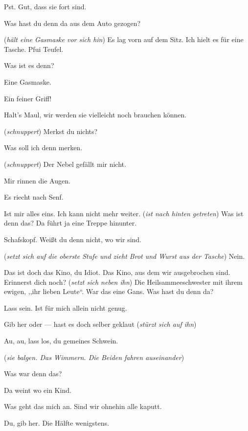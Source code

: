 \documentclass[
	final,
	a4paper,
	ngerman,
	mpinclude = true, %
	twoside = true,
	open = right,
	cleardoublepage = plain,
	DIV = 13,
	BCOR = 1cm,
	titlepage = firstiscover,
	]{scrbook}
\newcommand{\direction}[1]{(\textit{#1})}
\newcommand{\character}[1]{\item[#1]}
\newcommand{\ErsterMann}{\character{1. Mann}}
\newcommand{\ZweiterMann}{\character{2. Mann}}
\begin{document}
\begin{play}

\ErsterMann
Pst. Gut, dass sie fort sind.

\ZweiterMann
Was hast du denn da aus dem Auto gezogen?

\ErsterMann
\direction{hält eine Gasmaske vor sich hin} Es lag vorn auf dem Sitz. Ich hielt es für eine Tasche. Pfui Teufel.

\ZweiterMann
Was ist es denn?

\ErsterMann
Eine Gasmaske.

\ZweiterMann
Ein feiner Griff!

\ErsterMann
Halt's Maul, wir werden sie vielleicht noch brauchen können.

\direction{schnuppert} Merkst du nichts?

\ZweiterMann
Was soll ich denn merken.

\ErsterMann
\direction{schnuppert} Der Nebel gefällt mir nicht.

\ZweiterMann
Mir rinnen die Augen.

\ErsterMann
Es riecht nach Senf.

\ZweiterMann
Ist mir alles eins. Ich kann nicht mehr weiter. \direction{ist nach hinten getreten} Was ist denn das? Da führt ja eine Treppe hinunter.

\ErsterMann
Schafskopf. Weißt du denn nicht, wo wir sind.

\ZweiterMann
\direction{setzt sich auf die oberste Stufe und zieht Brot und Wurst aus der Tasche} Nein.

\ErsterMann
Das ist doch das Kino, du Idiot. Das Kino, aus dem wir ausgebrochen sind. Erinnerst dich noch? \direction{setzt sich neben ihn} Die Heilsammeeschwester mit ihrem ewigen, ,,ihr lieben Leute``. War das eine Gans. Was hast du denn da?

\ZweiterMann
Lass sein. Ist für mich allein nicht genug.

\ErsterMann
Gib her oder --- hast es doch selber geklaut \direction{stürzt sich auf ihn}

\ZweiterMann
Au, au, lass los, du gemeines Schwein.

\direction{sie balgen. Das Wimmern. Die Beiden fahren auseinander}

\ZweiterMann
Was war denn das?

\ErsterMann
Da weint wo ein Kind.

\ZweiterMann
Was geht das mich an. Sind wir ohnehin alle kaputt.

\ErsterMann
Du, gib her. Die Hälfte wenigstens.


\end{play}
\end{document}

